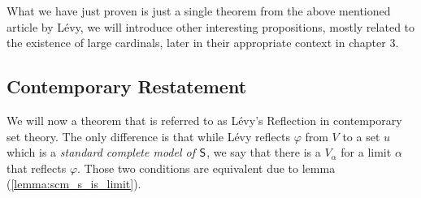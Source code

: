 What we have just proven is just a single theorem from the above mentioned article by Lévy, we will introduce other interesting propositions, mostly related to the existence of large cardinals, later in their appropriate context in chapter 3.


\subsection{Contemporary Restatement}
We will now a theorem that is referred to as Lévy's Reflection in contemporary set theory. The only difference is that while Lévy reflects $\varphi$ from $V$ to a set $u$ which is a \emph{standard complete model of $\sf{S}$}, we say that there is a $V_\alpha$ for a limit $\alpha$ that reflects $\varphi$. Those two conditions are equivalent due to lemma (\ref{lemma:scm_s_is_limit}).




